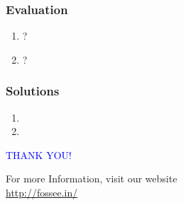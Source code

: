 \documentclass[12pt,presentation]{beamer}
\begin{document}
\begin{frame}[fragile]
\frametitle{Evaluation}
\label{sec-9}


\begin{enumerate}
\item ?
\vspace{8pt}
\item ? 
\end{enumerate}
\end{frame}
\begin{frame}
\frametitle{Solutions}
\label{sec-10}


\begin{enumerate}
\item 
\vspace{15pt}
\item 
\end{enumerate}
\end{frame}

\begin{frame}

  \begin{block}{}
  \begin{center}
  \textcolor{blue}{\Large THANK YOU!} 
  \end{center}
  \end{block}
\begin{block}{}
  \begin{center}
    For more Information, visit our website\\
    \url{http://fossee.in/}
  \end{center}  
  \end{block}
\end{frame}
\end{document}
